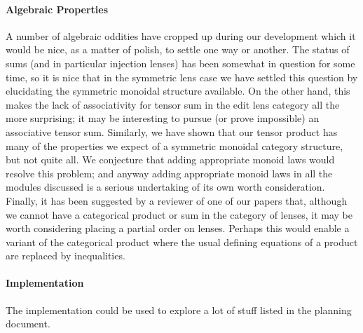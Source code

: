 \paragraph*{Algebraic Properties}
A number of algebraic oddities have cropped up during our development which
it would be nice, as a matter of polish, to settle one way or another. The
status of sums (and in particular injection lenses) has been somewhat in
question for some time, so it is nice that in the symmetric lens case we
have settled this question by elucidating the symmetric monoidal structure
available. On the other hand, this makes the lack of associativity for
tensor sum in the edit lens category all the more surprising; it may be
interesting to pursue (or prove impossible) an associative tensor sum.
Similarly, we have shown that our tensor product has many of the properties
we expect of a symmetric monoidal category structure, but not quite all. We
conjecture that adding appropriate monoid laws would resolve this problem;
and anyway adding appropriate monoid laws in all the modules discussed is a
serious undertaking of its own worth consideration. Finally, it has been
suggested by a reviewer of one of our papers that, although we cannot have a
categorical product or sum in the category of lenses, it may be worth
considering placing a partial order on lenses. Perhaps this would enable a
variant of the categorical product where the usual defining equations of a
product are replaced by inequalities.

\paragraph*{Implementation}
The implementation could be used to explore a lot of stuff listed in the
planning document.

